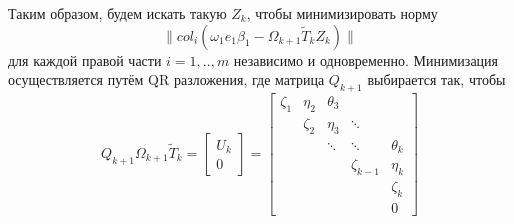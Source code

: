 Таким образом, будем искать такую $Z_k$, чтобы минимизировать норму 
$$\| col_i(\omega_1 e_1 \beta_1 - \Omega_{k+1} \tilde{T}_k Z_k) \|$$
для каждой правой части $i=1,..,m$ независимо и одновременно. Минимизация осуществляется
путём QR разложения, где матрица $Q_{k+1}$ выбирается так, чтобы 
$$Q_{k+1} \Omega_{k+1} \tilde{T}_k = \begin{bmatrix}
                                        U_k \\
                                        0
                                     \end{bmatrix} =  \begin{bmatrix}
                                                          \zeta_1 & \eta_2 & \theta_3 & & \\
                                                          & \zeta_2 & \eta_3 & \ddots & \\
                                                          & & \ddots & \ddots & \theta_k \\
                                                          & & & \zeta_{k-1} & \eta_{k} \\
                                                          & & & & \zeta_k \\
                                                          & & & & 0
                                                      \end{bmatrix}$$ 

\newpage

